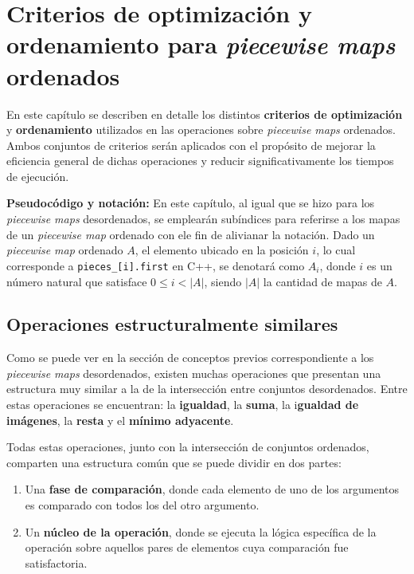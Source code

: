 \chapter{Criterios de optimización y ordenamiento para \textit{piecewise maps} ordenados}

En este capítulo se describen en detalle los distintos \textbf{criterios de optimización} y \textbf{ordenamiento} utilizados en las operaciones sobre \textit{piecewise maps} ordenados. Ambos conjuntos de criterios serán aplicados con el propósito de mejorar la eficiencia general de dichas operaciones y reducir significativamente los tiempos de ejecución.

\textbf{Pseudocódigo y notación:} En este capítulo, al igual que se hizo para los \textit{piecewise maps} desordenados, se emplearán subíndices para referirse a los mapas de un \textit{piecewise map} ordenado con ele fin de alivianar la notación. Dado un \textit{piecewise map} ordenado $A$, el elemento ubicado en la posición $i$, lo cual corresponde a \texttt{pieces\_[i].first} en C++, se denotará como \textbf{$A_i$}, donde $i$ es un número natural que satisface $0 \leq i < |A|$, siendo $|A|$ la cantidad de mapas de $A$.

\section{Operaciones estructuralmente similares}

Como se puede ver en la sección de conceptos previos correspondiente a los \textit{piecewise maps} desordenados, existen muchas operaciones que presentan una estructura muy similar a la de la intersección entre conjuntos desordenados. Entre estas operaciones se encuentran: la \textbf{igualdad}, la \textbf{suma}, la i\textbf{gualdad de imágenes}, la \textbf{resta} y el \textbf{mínimo adyacente}.

Todas estas operaciones, junto con la intersección de conjuntos ordenados, comparten una estructura común que se puede dividir en dos partes: 
\begin{enumerate}
    \item Una\textbf{ fase de comparación}, donde cada elemento de uno de los argumentos es comparado con todos los del otro argumento.
    \item Un \textbf{núcleo de la operación}, donde se ejecuta la lógica específica de la operación sobre aquellos pares de elementos cuya comparación fue satisfactoria.
\end{enumerate}

